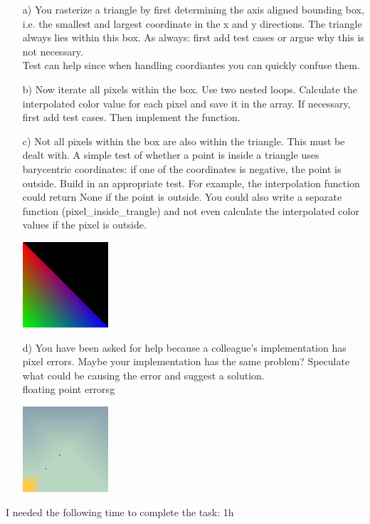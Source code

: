 \begin{enumerate}

\item[a)] You rasterize a triangle by first determining the axis aligned bounding box, i.e. the smallest and largest coordinate in the x and y directions. The triangle always lies within this box. As always: first add test cases or argue why this is not necessary.
\\
Test can help since when handling coordiantes you can quickly confuse them.


\item[b)] Now iterate all pixels within the box. Use two nested loops. Calculate the interpolated color value for each pixel and save it in the array. If necessary, first add test cases. Then implement the function.

\item[c)] Not all pixels within the box are also within the triangle. This must be dealt with. A simple test of whether a point is inside a triangle uses barycentric coordinates: if one of the coordinates is negative, the point is outside. Build in an appropriate test. For example, the interpolation function could return None if the point is outside. You could also write a separate function (pixel\_inside\_trangle) and not even calculate the interpolated color values if the pixel is outside.

\begin{center}
\includegraphics[width=0.25\textwidth]{source_code/interpolated.png}
\end{center}

\item[d)] You have been asked for help because a colleague's implementation has pixel errors. Maybe your implementation has the same problem? Speculate what could be causing the error and suggest a solution.
\\
floating point errorsg

\begin{center}
\includegraphics[width=0.25\textwidth]{source_code/example_pixel_error.png}
\end{center}

\end{enumerate}

I needed the following time to complete the task: 1h

